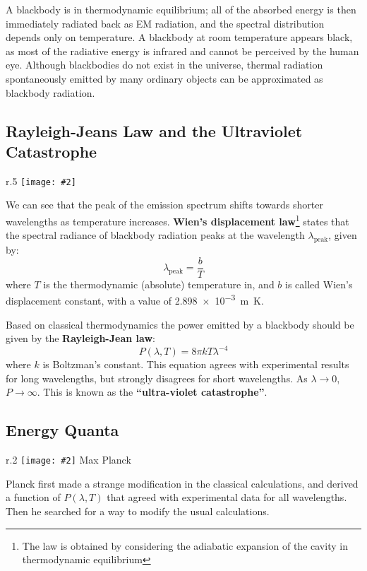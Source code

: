 \documentclass[11pt]{article}
\newcommand{\pic}[2]{\texttt{[image: \#2]}}
\begin{document}
A blackbody is in thermodynamic equilibrium; all of the absorbed energy is then
immediately radiated back as EM radiation, and the spectral distribution
depends only on temperature. A blackbody at room temperature appears black, as
most of the radiative energy is infrared and cannot be perceived by the human
eye. Although blackbodies do not exist in the universe, thermal radiation
spontaneously emitted by many ordinary objects can be approximated as blackbody
radiation.



\subsection{Rayleigh-Jeans Law and the Ultraviolet Catastrophe}

\begin{wrapfigure}{r}{.5\textwidth}
  \centering
  \pic{.5}{../1280px-Black_body.png}
\end{wrapfigure}
We can see that the peak of the emission spectrum shifts towards shorter
wavelengths as temperature increases.
\textbf{Wien's displacement law}\footnote{The law is obtained by
  considering the adiabatic expansion of the cavity in thermodynamic
  equilibrium} states that the spectral radiance of blackbody radiation peaks
at the wavelength $\lambda_{\text{peak}}$, given by:
\begin{equation}
  \lambda _{\text{peak}}=\frac {b}{T}
\end{equation}
where $T$ is the thermodynamic (absolute) temperature in, and $b$ is called
Wien's displacement constant, with a value of \SI{2.898e-3}{\metre\kelvin}.

Based on classical thermodynamics the power emitted by a blackbody should be
given by the \textbf{Rayleigh-Jean law}:
\begin{equation}
  P(\lambda,T)=8\pi kT\lambda^{-4}
\end{equation}
where $k$ is Boltzman's constant. This equation agrees with experimental
results for long wavelengths, but strongly disagrees for short wavelengths. As
$\lambda\rightarrow 0$, $P\rightarrow\infty$. This is known as the
\textbf{``ultra-violet catastrophe''}.

\subsection{Energy Quanta}

\begin{wrapfigure}{r}{.2\textwidth}
  \centering
  \pic{.2}{../20973-050-F6EEBFF1.jpg}
  Max Planck
\end{wrapfigure}
Planck first made a strange modification in the classical calculations, and
derived a function of $P(\lambda,T)$ that agreed with experimental data for all
wavelengths. 
Then he searched for a way to modify the usual calculations.
\end{document}
